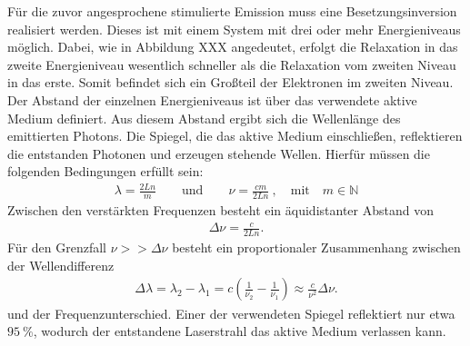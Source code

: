 Für die zuvor angesprochene stimulierte Emission muss eine Besetzungsinversion realisiert werden. Dieses ist mit einem System mit drei oder mehr Energieniveaus möglich. Dabei, wie in Abbildung XXX angedeutet, erfolgt die Relaxation in das zweite Energieniveau wesentlich schneller als die Relaxation vom zweiten Niveau in das erste. Somit befindet sich ein Großteil der Elektronen im zweiten Niveau. Der Abstand der einzelnen Energieniveaus ist über das verwendete aktive Medium definiert. Aus diesem Abstand ergibt sich die Wellenlänge des emittierten Photons. Die Spiegel, die das aktive Medium einschließen, reflektieren die entstanden Photonen und erzeugen stehende Wellen. Hierfür müssen die folgenden Bedingungen erfüllt sein:
\begin{align}
	\lambda=\frac{2Ln}{m}\qquad \text{und} \qquad\nu=\frac{cm}{2Ln}\:, \quad \text{mit}  \quad m \in \mathbb{N} 
\end{align}
Zwischen den verstärkten Frequenzen besteht ein äquidistanter Abstand von
\begin{align}
	\Delta \nu=\frac{c}{2Ln}.
\end{align}
Für den Grenzfall $\nu >>\Delta\nu$ besteht ein proportionaler Zusammenhang zwischen der Wellendifferenz
\begin{align}
	\Delta \lambda =\lambda_2- \lambda_1=c\left(\frac{1}{\nu_2}-\frac{1}{\nu_1}\right) \approx \frac{c}{\nu^2}\Delta\nu.
\end{align}
und der Frequenzunterschied. Einer der verwendeten Spiegel reflektiert nur etwa $\SI{95}{\percent}$, wodurch der entstandene Laserstrahl das aktive Medium verlassen kann.



